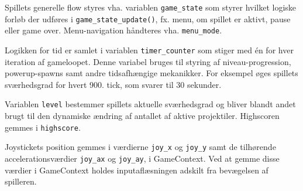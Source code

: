  Spillets generelle flow styres vha. variablen \texttt{game\_state} som styrer hvilket logiske forløb der udføres i \texttt{game\_state\_update()}, fx. menu, om spillet er aktivt, pause eller game over. Menu-navigation håndteres vha. \texttt{menu\_mode}.

 Logikken for tid er samlet i variablen \texttt{timer\_counter} som stiger med én for hver iteration af gameloopet. Denne variabel bruges til styring af niveau-progression, powerup-spawns samt andre tidsafhængige mekanikker. For eksempel øges spillets sværhedsgrad for hvert 900. tick, som svarer til 30 sekunder.

 Variablen \texttt{level} bestemmer spillets aktuelle sværhedsgrad og bliver blandt andet brugt til den dynamiske ændring af antallet af aktive projektiler. Highscoren gemmes i \texttt{highscore}.

 Joystickets position gemmes i værdierne \texttt{joy\_x} og \texttt{joy\_y} samt de tilhørende accelerationsværdier \texttt{joy\_ax} og \texttt{joy\_ay}, i GameContext. Ved at gemme disse værdier i GameContext holdes inputaflæsningen adskilt fra bevægelsen af spilleren.